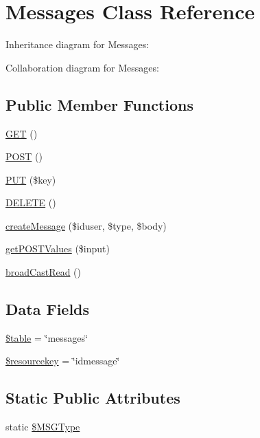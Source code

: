 \hypertarget{class_messages}{}\section{Messages Class Reference}
\label{class_messages}


Inheritance diagram for Messages\+:


Collaboration diagram for Messages\+:
\subsection*{Public Member Functions}
\begin{DoxyCompactItemize}
\item 
\mbox{\hyperlink{class_messages_a6155e84d5ffcbc4ae944e98f59d49935}{G\+ET}} ()
\item 
\mbox{\hyperlink{class_messages_a2a7e865a6254f6af7005197d30ad1cc0}{P\+O\+ST}} ()
\item 
\mbox{\hyperlink{class_messages_afc8eb51e951dd8fad1e318be851285ef}{P\+UT}} (\$key)
\item 
\mbox{\hyperlink{class_messages_ab31369bc9c8f31518ed38c1949beb791}{D\+E\+L\+E\+TE}} ()
\item 
\mbox{\hyperlink{class_messages_a625b4df587c67708409abc575f514e47}{create\+Message}} (\$iduser, \$type, \$body)
\item 
\mbox{\hyperlink{class_messages_abe4378dfc123f2572b60965349062654}{get\+P\+O\+S\+T\+Values}} (\$input)
\item 
\mbox{\hyperlink{class_messages_ab62572471dcfdfd3352f83a82ee12925}{broad\+Cast\+Read}} ()
\end{DoxyCompactItemize}
\subsection*{Data Fields}
\begin{DoxyCompactItemize}
\item 
\mbox{\hyperlink{class_messages_ae8876a14058f368335baccf35af4a22b}{\$table}} = \char`\"{}messages\char`\"{}
\item 
\mbox{\hyperlink{class_messages_aebf9a45aba50bace51a0400cdafdd8d3}{\$resourcekey}} = \char`\"{}idmessage\char`\"{}
\end{DoxyCompactItemize}
\subsection*{Static Public Attributes}
\begin{DoxyCompactItemize}
\item 
static \mbox{\hyperlink{class_messages_afa3b0388d92464be7fe8b3385bd4d6ad}{\$\+M\+S\+G\+Type}}
\end{DoxyCompactItemize}
